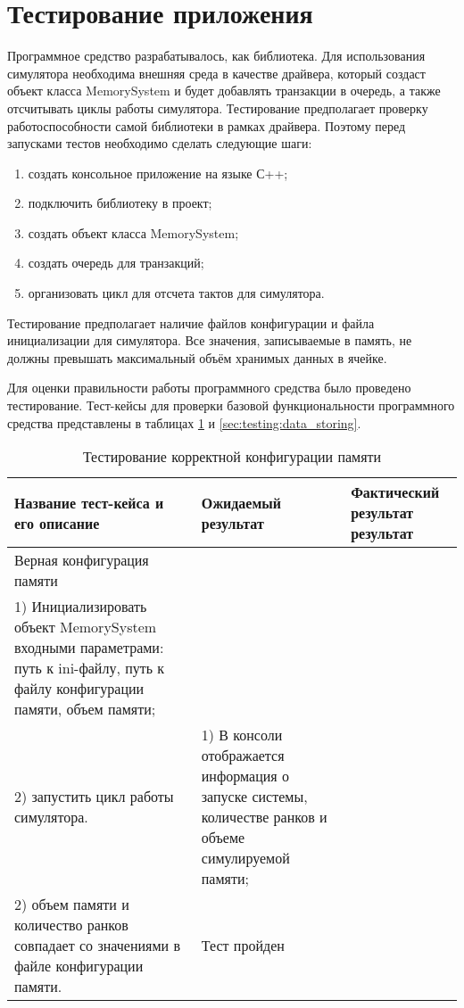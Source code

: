 \section{Тестирование приложения}
\label{sec:testing}
Программное средство разрабатывалось, как библиотека. Для использования симулятора необходима внешняя среда в качестве драйвера, который создаст объект класса MemorySystem и будет добавлять транзакции в очередь, а также отсчитывать циклы работы симулятора. Тестирование предполагает проверку работоспособности самой библиотеки в рамках драйвера. Поэтому перед запусками тестов необходимо сделать следующие шаги:
\begin{enumerate}
  \item создать консольное приложение на языке С++;
  \item подключить библиотеку в проект;
  \item создать объект класса MemorySystem;
  \item создать очередь для транзакций; 
  \item организовать цикл для отсчета тактов для симулятора.
\end{enumerate}

Тестирование предполагает наличие файлов конфигурации и файла инициализации для симулятора. Все значения, записываемые в память, не должны превышать максимальный объём хранимых данных в ячейке. 

Для оценки правильности работы программного средства было проведено тестирование. Тест-кейсы для проверки базовой функциональности программного средства представлены в таблицах \ref{sec:testing:configuration} и \ref{sec:testing:data_storing}.

\begin{longtable}[l]{| >{\raggedright}p{}
                     | >{\raggedright}p{}
                     | >{\raggedright\arraybackslash}p{}|}
  \caption{Тестирование корректной конфигурации памяти}
  \label{sec:testing:configuration} \tabularnewline

  \hline
       Название тест-кейса и его описание & Ожидаемый результат & Фактический результат результат \\
   \hline
   Верная конфигурация памяти \\ 
   1) Инициализировать объект MemorySystem входными параметрами: путь к ini-файлу, путь к файлу конфигурации памяти, объем памяти; \\ 
   2) запустить цикл работы симулятора.

   &
   1) В консоли отображается информация о запуске системы, количестве ранков и объеме симулируемой памяти; \\
   2) объем памяти и количество ранков совпадает со значениями в файле конфигурации памяти.

   & Тест пройден \\
   \hline
\end{longtable}

